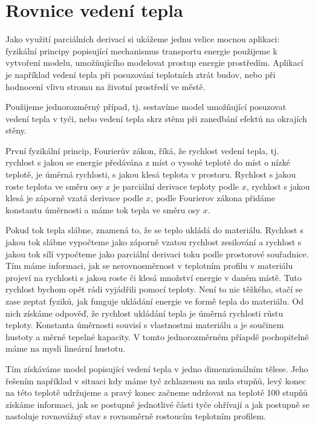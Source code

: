 \documentclass[12pt]{article}
\begin{document}
\newpage
\section*{Rovnice vedení tepla}


Jako využití parciálních derivací si ukážeme jednu velice mocnou aplikaci: fyzikální principy popisující mechanismus transportu energie použijeme k vytvoření modelu, umožňujícího modelovat prostup energie prostředím. Aplikací je například vedení tepla při posuzování teplotních ztrát budov, nebo při hodnocení vlivu stromu na životní prostředí ve městě.

Použijeme jednorozměrný případ, tj. sestavíme model umožňující posuzovat vedení tepla v tyči, nebo vedení tepla skrz stěnu při zanedbání efektů na okrajích stěny. 

První fyzikální princip, Fourierův zákon, říká, že rychlost vedení tepla, tj. rychlost s jakou se energie předávána z míst o vysoké teplotě do míst o nízké teplotě, je úměrná rychlosti, s jakou klesá teplota v prostoru. Rychlost s jakou roste teplota ve směru osy $x$ je parciální derivace teploty podle $x$, rychlost s jakou klesá je záporně vzatá derivace podle $x$, podle Fourierov zákona přidáme konstantu úměrnosti a máme tok tepla ve směru osy $x$.

Pokud tok tepla slábne, znamená to, že se teplo ukládá do materiálu. Rychlost s jakou tok slábne vypočteme jako záporně vzatou rychlost zesilování a rychlost s jakou tok sílí vypočteme jako parciální derivaci toku podle prostorové souřadnice. Tím máme informaci, jak se nerovnosměrnost v teplotním profilu v materiálu projeví na rychlosti s jakou roste či klesá množství energie v daném místě. Tuto rychlost bychom opět rádi vyjádřili pomocí teploty. Není to nic těžkého, stačí se zase zeptat fyziků, jak funguje ukládání energie ve formě tepla do materiálu. Od nich získáme odpověď, že rychlost ukládání tepla je úměrná rychlosti růstu teploty. Konstanta úměrnosti souvisí s vlastnostmi materiálu a je součinem hustoty a měrné tepelné kapacity. V tomto jednorozměrném příapdě pochopitelně máme na mysli lineární hustotu. 

Tím získáváme model popisující vedení tepla v jedno dimenzionálním tělese. Jeho řešením například v situaci kdy máme tyč zchlazenou na nula stupňů, levý konec na této teplotě udržujeme a pravý konec začneme udržovat na teplotě 100 stupňů získáme informaci, jak se postupně jednotlivé části tyče ohřívají a jak postupně se nastoluje rovnovážný stav s rovnoměrně rostoucím teplotním profilem.
\end{document}
